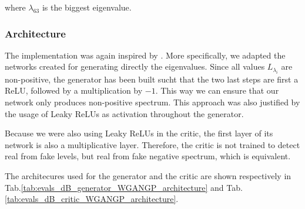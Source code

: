 \documentclass{article}
\begin{document}
where $\lambda_{63}$ is the biggest eigenvalue.

\subsubsection{Architecture}

The implementation was again inspired by \cite{nain2020wgangp}. More specifically, we adapted the networks created for generating directly the eigenvalues. Since all values $L_{\lambda_i}$ are non-positive, the generator has been built sucht that the two last steps are first a ReLU, followed by a multiplication by $-1$. This way we can ensure that our network only produces non-positive spectrum. This approach was also justified by the usage of Leaky ReLUs as activation throughout the generator. 

Because we were also using Leaky ReLUs in the critic, the first layer of its network is  also a multiplicative layer. Therefore, the critic is not trained to detect real from fake levels, but real from fake negative spectrum, which is equivalent.

The architecures used for the generator and the critic are shown respectively in Tab.\ref{tab:evals_dB_generator_WGANGP_architecture} and Tab.\ref{tab:evals_dB_critic_WGANGP_architecture}.
\end{document}
